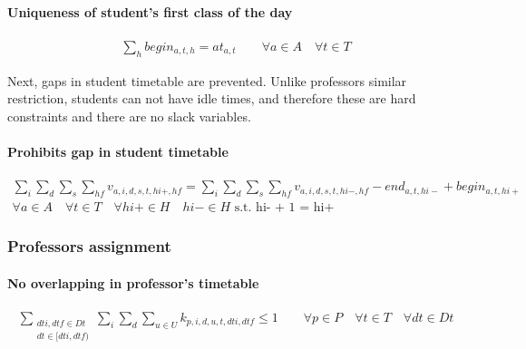 \paragraph{Uniqueness of student's first class of the day}
\begin{eqnarray}
\sum\limits_{h} begin_{a,t,h} = at_{a,t} \nonumber \qquad
\forall a \in A \quad
\forall t \in T
\end{eqnarray}


Next, gaps in student timetable are prevented. Unlike professors similar restriction, students can not have idle times, and therefore these are hard constraints and there are no slack variables.

\paragraph{Prohibits gap in student timetable}
\begin{eqnarray}
\sum\limits_{i} \sum\limits_{d} \sum\limits_{s} \sum\limits_{hf} v_{a,i,d,s,t,hi+,hf} = 
\sum\limits_{i} \sum\limits_{d} \sum\limits_{s} \sum\limits_{hf} v_{a,i,d,s,t,hi-,hf} - end_{a,t,hi-} + begin_{a,t,hi+} \nonumber \qquad
\\
\forall a \in A \quad
\forall t \in T \quad
\forall hi+ \in H \quad hi- \in H \mbox{ s.t. hi- + 1 = hi+} \nonumber
\end{eqnarray}


\subsubsection{Professors assignment}

\paragraph{No overlapping in professor's timetable}
\begin{eqnarray}
\sum_{ \substack {dti,dtf \in Dt \\ dt \in [dti,dtf)} } \sum\limits_{i} \sum\limits_{d} \sum\limits_{u \in U} k_{p,i,d,u,t,dti,dtf} \le 1 \nonumber \qquad
\forall p \in P \quad
\forall t \in T \quad
\forall dt \in Dt
\end{eqnarray}

